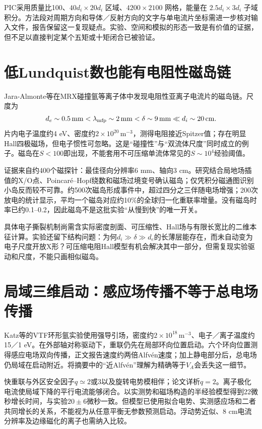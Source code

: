 PIC采用质量比100、$40d_i\times20d_i$ 区域、$4200\times2100$ 网格，能量在 $2.5d_i\times3d_i$ 子域积分。方法段对周期方向和导体／反射方向的文字与单电流片坐标需进一步核对输入文件，报告保留这一复现疑点。实验、空间和模拟的形态一致是有价值的证据，但不足以直接判定某个五矩或十矩闭合已被验证。

\section{低Lundquist数也能有电阻性磁岛链}
Jara-Almonte等在MRX碰撞氩等离子体中发现电阻性亚离子电流片的磁岛链。尺度为
\begin{equation*}
 d_e\sim0.5\,\mathrm{mm}<\lambda_{\rm mfp}\sim2\,\mathrm{mm}
 <\delta\sim9\,\mathrm{mm}\ll d_i\sim20\,\mathrm{cm}.
\end{equation*}
片内电子温度约4 eV、密度约$2\times10^{20}\,\mathrm m^{-3}$，测得电阻接近Spitzer值；存在明显Hall四极磁场，但电子惯性可忽略。这是“碰撞性”与“双流体尺度”同时成立的例子。磁岛在$S<100$即出现，不能套用不可压缩单流体常见的$S\sim10^4$经验阈值。\citep{E448}

证据来自约400个磁探针：最佳径向分辨率6 mm、轴向3 cm。研究结合局地场插值的X/O点、Poincar\'e--Hopf绕数和磁场过境变号确认磁岛；仅凭积分磁通图识别小岛反而较不可靠。约500次磁岛形成事件中，超过四分之三伴随电场增强；200次放电的统计显示，平均一个磁岛对应约10\%的全球归一化重联率增量。没有磁岛时率已约0.1--0.2，因此磁岛不是这批实验“从慢到快”的唯一开关。

具体电子撕裂机制尚需含实际密度剖面、可压缩性、Hall场与有限长宽比的二维本征计算。实验还留下结构问题：为何$ d_i\gg\delta\gg d_e$的长薄层能存在，而未自动变为电子尺度开放X形？可压缩电阻Hall模型有机会解决其中一部分，但需复现实验驱动和尺度，不能只画相似磁岛。

\section{局域三维启动：感应场传播不等于总电场传播}
Katz等的VTF环形氩实验使用强导引场，密度约$2\times10^{18}\,\mathrm m^{-3}$、电子／离子温度约15／1 eV。在外部轴对称驱动下，重联仍先在局部环向位置启动。六个环向位置测得感应电场双向传播，正文报告速度约两倍Alfvén速度；加上静电部分后，总电场仍局域在启动附近。将摘要中的“近Alfvén”理解为精确等于$V_A$会丢失这一细节。\citep{Katz2010}

快重联与外区安全因子$q\simeq2$或3以及旋转电势模相伴；论文详析$q=2$。离子极化电流使局域下降的平行电流能够闭合。以实测势和磁场构造的半经验模型得到22微秒增长时间，与实验$20\pm6$微秒一致。但模型已使用拟合电势、实测感应场和二者共同增长的关系，不能视为从任意平衡无参数预测启动。浮动势近似、8 cm电流分辨率及边缘磁化的离子也需纳入比较。

